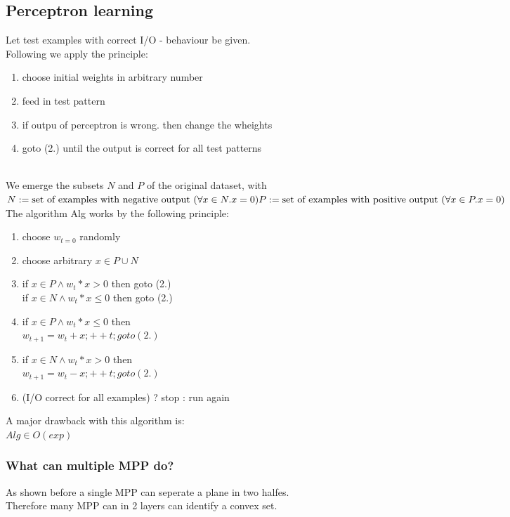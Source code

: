 \documentclass{article}
\begin{document}
\subsection{Perceptron learning}
Let test examples with correct I/O - behaviour be given.\\
Following we apply the principle:
\begin{enumerate}
    \item choose initial weights in arbitrary number
    \item feed in test pattern
    \item if outpu of perceptron is wrong. then change the wheights
    \item goto (2.) until the output is correct for all test patterns
\end{enumerate}\ \\
We emerge the subsets $N$ and $P$ of the original dataset, with\\
$
N := \text{set of examples with negative output ($\forall x \in N. x = 0$)}\\
P := \text{set of examples with positive output ($\forall x \in P. x = 0$)}\\
$
\\
The algorithm Alg works by the following principle:
\begin{enumerate}
    \item choose $w_{t=0}$ randomly
    \item choose arbitrary $x \in P \cup N$
    \item   if $x \in P \land  w_t * x > 0$ then goto (2.) \\ 
            if $x \in N \land  w_t * x \leq 0$ then goto (2.)
    \item   if $x \in P \land w_t * x \leq 0$ then\\
            $w_{t+1} = w_t + x; ++t; goto(2.)$
    \item   if $x \in N \land w_t * x > 0$ then\\
            $w_{t+1} = w_t - x; ++t; goto(2.)$
    \item   (I/O correct for all examples) ? stop : run again
\end{enumerate}
A major drawback with this algorithm is:\\
$Alg \in O(exp)$
\subsubsection{What can multiple MPP do?}
As shown before a single MPP can seperate a plane in two halfes.\\
Therefore many MPP can in 2 layers can identify a convex set.\\
\end{document}
